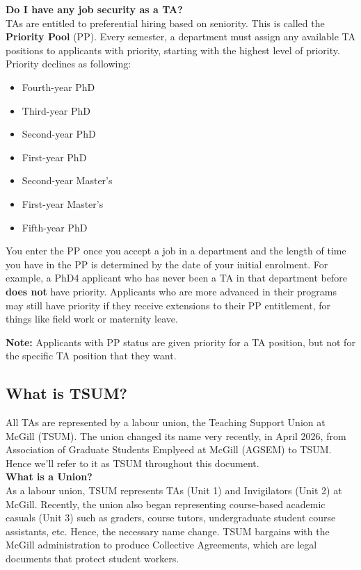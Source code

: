 \noindent \textbf{\sffamily Do I have any job security as a TA?} \\
TAs are entitled to preferential hiring based on seniority. This is called the
\textbf{Priority Pool} (PP). Every semester, a department must assign any available TA positions to applicants with priority, starting with the highest level of priority. Priority declines as following:

\begin{plaindefinition}
    \begin{itemize}
        \item Fourth-year PhD
        \item Third-year PhD
        \item Second-year PhD
        \item First-year PhD
        \item Second-year Master's
        \item First-year Master's
        \item Fifth-year PhD
    \end{itemize}
\end{plaindefinition}

\noindent You enter the PP once you accept a job in a department and the length of time you have in the PP is determined by the date of your initial enrolment. For example, a PhD4 applicant who has never been a TA in that department before \textbf{does not} have priority. Applicants who are more advanced in their programs may still have priority if they receive extensions to their PP entitlement, for things like field work or maternity leave.

\noindent\textbf{\color{ocre} Note:} Applicants with PP status are given priority for a TA position, but not for
the specific TA position that they want. 

\subsection{What is TSUM?} 
All TAs are represented by a labour union, the Teaching Support Union at McGill (TSUM). The union changed its name very recently, in April 2026, from Association of Graduate Students Emplyeed at McGill (AGSEM) to TSUM. Hence we'll refer to it as TSUM throughout this document. \\

\noindent \textbf{\sffamily What is a Union?} \\
As a labour union, TSUM represents TAs (Unit 1) and Invigilators (Unit 2) at McGill. Recently, the union also began representing  course-based academic casuals (Unit 3) such as graders, course tutors, undergraduate student course assistants, etc. Hence, the necessary name change. TSUM bargains with the McGill administration to produce Collective Agreements, which are legal documents that protect student workers.

